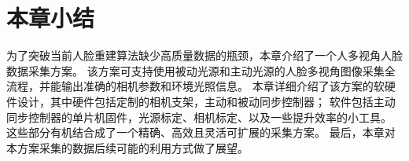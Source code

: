 \section*{本章小结}

为了突破当前人脸重建算法缺少高质量数据的瓶颈，本章介绍了一个人多视角人脸数据采集方案。
该方案可支持使用被动光源和主动光源的人脸多视角图像采集全流程，并能输出准确的相机参数和环境光照信息。
本章详细介绍了该方案的软硬件设计，其中硬件包括定制的相机支架，主动和被动同步控制器；
软件包括主动同步控制器的单片机固件，光源标定、相机标定、以及一些提升效率的小工具。
这些部分有机结合成了一个精确、高效且灵活可扩展的采集方案。
最后，本章对本方案采集的数据后续可能的利用方式做了展望。
